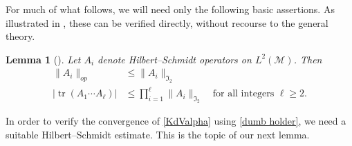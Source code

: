 \documentclass{amsart}
\newcommand{\op}{\textit{op}}
\DeclareMathOperator{\tr}{tr}
\newtheorem{lemma}[theorem]{Lemma}
\theoremstyle{definition}
\theoremstyle{remark}
\begin{document}
For much of what follows, we will need only the following basic assertions.  As illustrated in \cite{KVZ}, these can be verified directly, without recourse to the general theory.

\begin{lemma}[{\cite[Lemma 1.4]{KVZ}}] \label{L:dumb}
Let $A_i$ denote Hilbert--Schmidt operators on $L^2(\mathcal M)$.  Then
\begin{align}\label{dumb norm}
\| A_i \|_{\op} &\leq \| A_i \|_{\mathfrak I_2} \\
| \tr( A_1\cdots A_\ell ) | &\leq \prod_{i=1}^\ell \| A_i \|_{\mathfrak I_2}\quad\text{for all integers $\ell\geq 2$.} \label{dumb holder}
\end{align}
\end{lemma}

In order to verify the convergence of \eqref{KdValpha} using \eqref{dumb holder}, we need a suitable Hilbert--Schmidt estimate.  This is the topic of our next lemma.
\end{document}
